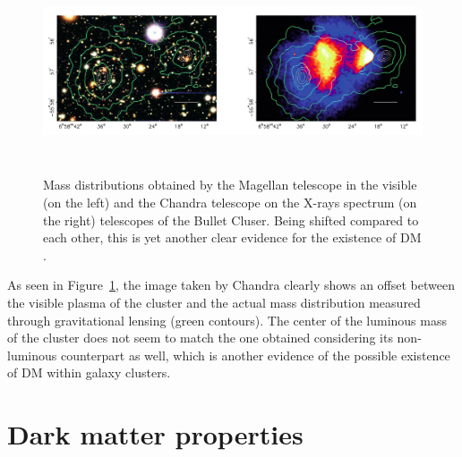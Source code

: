 \documentclass[a4paper, 10pt, openright]{report}
\begin{document}
\begin{figure}[htbp]
\begin{center}
\includegraphics[width=14cm, height=6cm]{figs/BulletCluster.png}
\caption{Mass distributions obtained by the Magellan telescope in the visible (on the left) and the Chandra telescope on the X-rays spectrum (on the right) telescopes of the Bullet Cluser. Being shifted compared to each other, this is yet another clear evidence for the existence of \ac{DM} \cite{BulletClusterSigma}.}
\label{figure:BulletCluster}
\end{center}
\end{figure}

As seen in Figure~\ref{figure:BulletCluster}, the image taken by Chandra clearly shows an offset between the visible plasma of the cluster and the actual mass distribution measured through gravitational lensing (green contours). The center of the luminous mass of the cluster does not seem to match the one obtained considering its non-luminous counterpart as well, which is another evidence of the possible existence of \ac{DM} within galaxy clusters.

\section{Dark matter properties} \label{section:DMProperties}
\end{document}
